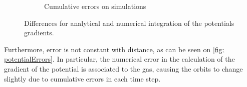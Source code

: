 \begin{figure}[!h]
\begin{subfigure}[t]{0.4\textwidth}
				\caption{Cumulative errors on simulations}
				\label{fig: simulationErrors}
			\end{subfigure}
			\caption{Differences for analytical and numerical integration of the potentials gradients.}
			\label{fig: numericalErrors}
		\end{figure}
	
		Furthermore, error is not constant with distance, as can be seen on \autoref{fig: potentialErrors}. In particular, the numerical error in the calculation of the gradient of the potential is associated to the gas, causing the orbits to change slightly due to cumulative errors in each time step.